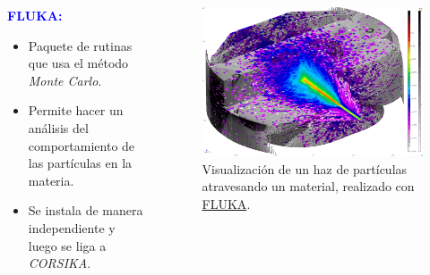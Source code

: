     \begin{frame}{} %
        \justifying %
        \vspace*{-0.1cm} %

        \begin{columns}
            \begin{column}{0.5\textwidth} %
                \textcolor{blue}{\textbf{FLUKA:}}
                \begin{itemize}
                    \item Paquete de rutinas que usa el método \emph{Monte Carlo}.
                    \item Permite hacer un análisis del comportamiento de las partículas en la materia.
                    \item Se instala de manera independiente y luego se liga a \emph{CORSIKA}.
                \end{itemize}
            \end{column}

            \begin{column}{0.3\textwidth} %
                \begin{figure}
                    \includegraphics[width=1.2\textwidth]{Figures/fluka.png}
                    \caption{\tiny Visualización de un haz de partículas atravesando un material, realizado con \href{https://fluka.cern/documentation/running/flair-gui}{FLUKA}.}  
                \end{figure}              
            \end{column}
        \end{columns}
    \end{frame}  

